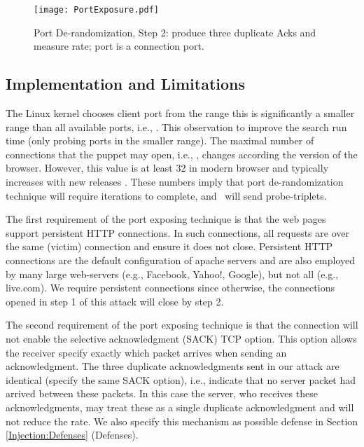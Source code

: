 \documentclass[conference]{IEEEtran}
\begin{document}
\begin{figure}
  \begin{center}
    \texttt{[image: PortExposure.pdf]}
  \end{center}
  \caption{Port De-randomization, Step 2: produce three duplicate Acks and measure rate; port  is a connection port.}
   \label{fig:portexposureiter}
\end{figure}


\subsection{Implementation and Limitations} \label{ports:values}

The Linux kernel chooses client port from the range  this is significantly a smaller range than all available ports, i.e., . This observation to improve the search run time (only probing ports in the smaller range). The maximal number of connections that the puppet may open, i.e., , changes according the version of the browser. However, this value is at least 32 in modern browser and typically increases with new releases \cite{browsers-stats}. These numbers imply that port de-randomization technique will require  iterations to complete, and \mal\ will send  probe-triplets.

The first requirement of the port exposing technique is that the web pages support persistent HTTP connections. In such connections, all requests are over the same (victim) connection and ensure it does not close. Persistent HTTP connections are the default configuration of apache servers and are also employed by many large web-servers (e.g., Facebook, Yahoo!, Google), but not all (e.g., live.com). We require persistent connections since otherwise, the connections opened in step 1 of this attack will close by step 2. 

The second requirement of the port exposing technique is that the connection will not enable the selective acknowledgment (SACK) TCP option. This option allows the receiver specify exactly which packet arrives when sending an acknowledgment. The three duplicate acknowledgments sent in our attack are identical (specify the same SACK option), i.e., indicate that no server packet had arrived between these packets. In this case the server, who receives these acknowledgments, may treat these as a single duplicate acknowledgment and will not reduce the rate. We also specify this mechanism as possible defense in Section \ref{Injection:Defenses} (Defenses).
\end{document}
